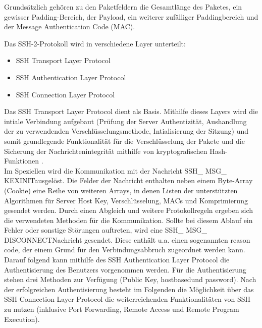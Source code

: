 Grundsätzlich gehören zu den Paketfeldern die Gesamtlänge des Paketes, ein gewisser Padding-Bereich, der Payload, ein weiterer zufälliger Paddingbereich und der Message Authentication Code (MAC). 

Das SSH-2-Protokoll wird in verschiedene Layer unterteilt:
\begin{itemize}
\item SSH Transport Layer Protocol
\item SSH Authentication Layer Protocol
\item SSH Connection Layer Protocol
\end{itemize}

Das SSH Transport Layer Protocol dient als Basis. Mithilfe dieses Layers wird die intiale Verbindung aufgebaut (Prüfung der Server Authentizität, Aushandlung der zu verwendenden Verschlüsselungsmethode, Intialisierung der Sitzung) und somit grundlegende Funktionalität für die Verschlüsselung der Pakete und die Sicherung der Nachrichtenintegrität mithilfe von kryptografischen Hash-Funktionen \citep{SSH1}. \\%

Im Speziellen wird die Kommunikation mit der Nachricht \glqq SSH\_ MSG\_ KEXINIT\grqq  ausgelöst. Die Felder der Nachricht enthalten neben einem Byte-Array (Cookie) eine Reihe von weiteren Arrays, in denen Listen der unterstützten Algorithmen für Server Host Key, Verschlüsselung, MACs und Komprimierung gesendet werden. 
Durch einen Abgleich und weitere Protokollregeln ergeben sich die verwendeten Methoden für die Kommunikation. Sollte bei diesem Ablauf ein Fehler oder sonstige Störungen auftreten, wird eine \glqq SSH\_ MSG\_ DISCONNECT\grqq  Nachricht gesendet. Diese enthält u.a. einen sogenannten \glqq reason code\grqq , der einem Grund für den Verbindungsabbruch zugeordnet werden kann.\\

Darauf folgend kann mithilfe des SSH Authentication Layer Protocol die Authentisierung des Benutzers vorgenommen werden. Für die Authentisierung stehen drei Methoden zur Verfügung (\glqq Public Key\grqq , \glqq hostbased\grqq  und \glqq password\grqq ). Nach der erfolgreichen Authentisierung besteht im Folgenden die Möglichkeit über das SSH Connection Layer Protocol die weiterreichenden Funktionalitäten von SSH zu nutzen (inklusive Port Forwarding, Remote Access und Remote Program Execution)\citep{SSH1}. \\%


